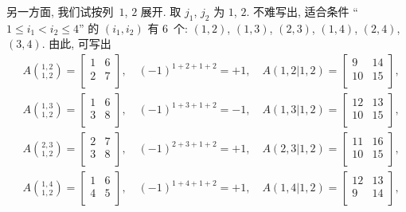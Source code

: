 \begin{example}
    另一方面,
    我们试按列~\(1\), \(2\) 展开.
    取 \(j_1\), \(j_2\) 为 \(1\), \(2\).
    不难写出, 适合条件
    ``\(1 \leq i_1 < i_2 \leq 4\)''
    的 \((i_1, i_2)\) 有 \(6\)~个:
    \((1, 2)\),
    \((1, 3)\), \((2, 3)\),
    \((1, 4)\), \((2, 4)\), \((3, 4)\).
    由此, 可写出
    \begin{align*}
         & A\binom{1,2}{1,2}
        = \begin{bmatrix}1&6\\2&7\\ \end{bmatrix},
        \quad
        (-1)^{1+2+1+2} = +1,
        \quad
        A(1,2|1,2)
        = \begin{bmatrix}9&14\\10&15\\ \end{bmatrix},  \\
         & A\binom{1,3}{1,2}
        = \begin{bmatrix}1&6\\3&8\\ \end{bmatrix},
        \quad
        (-1)^{1+3+1+2} = -1,
        \quad
        A(1,3|1,2)
        = \begin{bmatrix}12&13\\10&15\\ \end{bmatrix}, \\
         & A\binom{2,3}{1,2}
        = \begin{bmatrix}2&7\\3&8\\ \end{bmatrix},
        \quad
        (-1)^{2+3+1+2} = +1,
        \quad
        A(2,3|1,2)
        = \begin{bmatrix}11&16\\10&15\\ \end{bmatrix}, \\
         & A\binom{1,4}{1,2}
        = \begin{bmatrix}1&6\\4&5\\ \end{bmatrix},
        \quad
        (-1)^{1+4+1+2} = +1,
        \quad
        A(1,4|1,2)
        = \begin{bmatrix}12&13\\9&14\\ \end{bmatrix},  \\

\end{align*}
\end{example}
